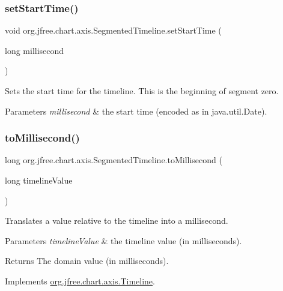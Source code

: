 \subsubsection{\texorpdfstring{set\+Start\+Time()}{setStartTime()}}
{\footnotesize\ttfamily void org.\+jfree.\+chart.\+axis.\+Segmented\+Timeline.\+set\+Start\+Time (\begin{DoxyParamCaption}\item[{long}]{millisecond }\end{DoxyParamCaption})}

Sets the start time for the timeline. This is the beginning of segment zero.


\begin{DoxyParams}{Parameters}
{\em millisecond} & the start time (encoded as in java.\+util.\+Date). \\
\hline
\end{DoxyParams}
\mbox{\label{classorg_1_1jfree_1_1chart_1_1axis_1_1_segmented_timeline_a734fc49f503e38b51902dbee8f27c060}} 
\subsubsection{\texorpdfstring{to\+Millisecond()}{toMillisecond()}}
{\footnotesize\ttfamily long org.\+jfree.\+chart.\+axis.\+Segmented\+Timeline.\+to\+Millisecond (\begin{DoxyParamCaption}\item[{long}]{timeline\+Value }\end{DoxyParamCaption})}

Translates a value relative to the timeline into a millisecond.


\begin{DoxyParams}{Parameters}
{\em timeline\+Value} & the timeline value (in milliseconds).\\
\hline
\end{DoxyParams}
\begin{DoxyReturn}{Returns}
The domain value (in milliseconds). 
\end{DoxyReturn}


Implements \mbox{\hyperlink{interfaceorg_1_1jfree_1_1chart_1_1axis_1_1_timeline_aa4bc34f354e4819d481369a12415a8c3}{org.\+jfree.\+chart.\+axis.\+Timeline}}.


